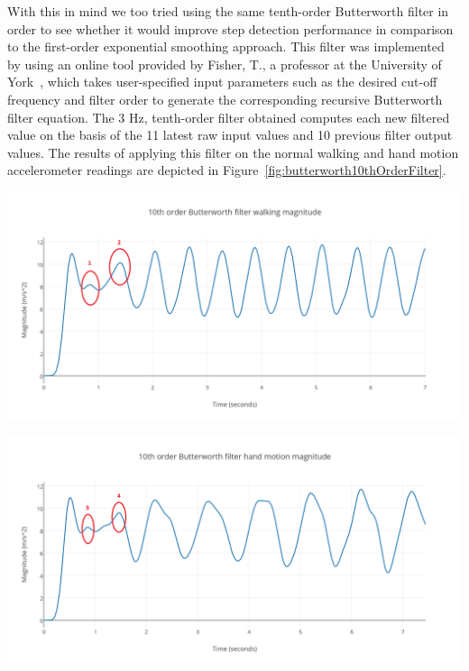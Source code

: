 \documentclass[main.tex]{subfiles}
\begin{document}
With this in mind we too tried using the same tenth-order Butterworth filter in order to see whether it would improve step detection performance in comparison to the first-order exponential smoothing approach. This filter was implemented by using an online tool provided by Fisher, T., a professor at the University of York~\cite{filterTool}, which takes user-specified input parameters such as the desired cut-off frequency and filter order to generate the corresponding recursive Butterworth filter equation. The 3 Hz, tenth-order filter obtained computes each new filtered value on the basis of the 11 latest raw input values and 10 previous filter output values. The results of applying this filter on the normal walking and hand motion accelerometer readings are depicted in Figure~\ref{fig:butterworth10thOrderFilter}. 
\begin{center}
  \begin{minipage}[b]{0.5\textwidth}
    \includegraphics[scale=0.2]{images/butterworth10thOrderFilterWalkingMagnitude.png}
  \end{minipage}%
  \begin{minipage}[b]{0.5\textwidth}
    \includegraphics[scale=0.2]{images/butterworth10thOrderFilterHandMotionMagnitude.png}
\end{minipage}
\label{fig:butterworth10thOrderFilter}
\end{center}
\end{document}
